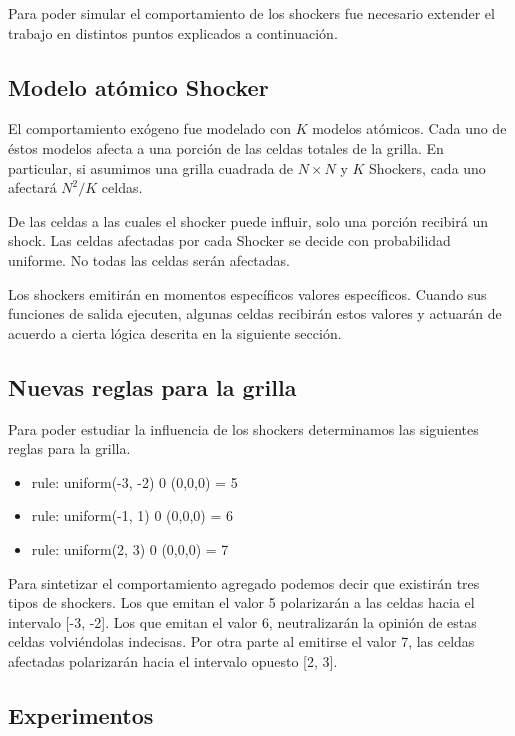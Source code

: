 Para poder simular el comportamiento de los shockers fue necesario extender el trabajo en distintos puntos explicados a continuación.

\subsection{Modelo atómico Shocker}

El comportamiento exógeno fue modelado con $K$  modelos atómicos. Cada uno de éstos modelos afecta a una porción de las celdas totales de la grilla.
En particular, si asumimos una grilla cuadrada de $N \times N$ y $K$ Shockers, cada uno afectará $N^2/K$ celdas.

De las celdas a las cuales el shocker puede influir, solo una porción recibirá un shock. Las celdas afectadas por cada Shocker se decide con probabilidad uniforme. No todas las celdas serán afectadas.

Los shockers emitirán en momentos específicos valores específicos. Cuando sus funciones de salida ejecuten, algunas celdas recibirán estos valores y actuarán de acuerdo a cierta lógica descrita en la siguiente sección.


\subsection{Nuevas reglas para la grilla}

Para poder estudiar la influencia de los shockers determinamos las siguientes reglas para la grilla.

\begin{itemize}
    \item rule: {  uniform(-3, -2) } 0 { (0,0,0) = 5 }
    \item rule: {  uniform(-1, 1)  } 0 { (0,0,0) = 6 }
    \item rule: {  uniform(2, 3) } 0 { (0,0,0) = 7 } 
\end{itemize}

Para sintetizar el comportamiento agregado podemos decir que existirán tres tipos de shockers. Los que emitan el valor 5 polarizarán a las celdas hacia el intervalo [-3, -2]. Los que emitan el valor 6, neutralizarán la opinión de estas celdas volviéndolas indecisas. Por otra parte al emitirse el valor 7, las celdas afectadas polarizarán hacia el intervalo opuesto [2, 3].


\subsection{Experimentos}

